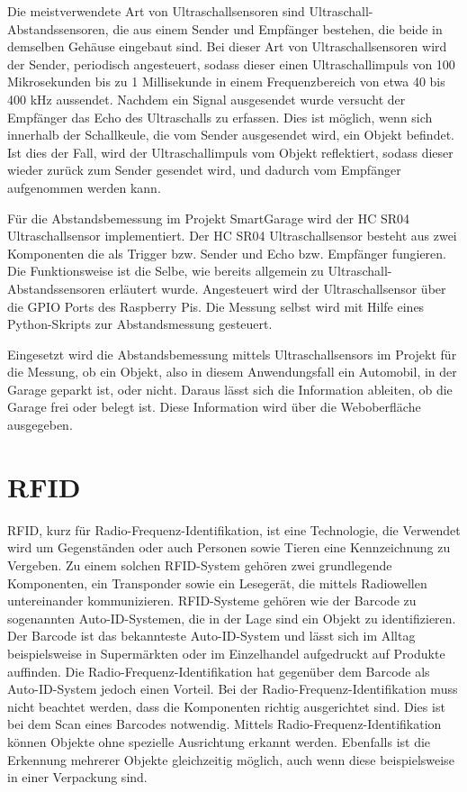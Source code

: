 Die meistverwendete Art von Ultraschallsensoren sind Ultraschall-Abstandssensoren, die aus einem Sender und Empfänger bestehen, die beide in demselben Gehäuse eingebaut sind. Bei dieser Art von Ultraschallsensoren wird der Sender, periodisch angesteuert, sodass dieser einen Ultraschallimpuls von 100 Mikrosekunden bis zu 1 Millisekunde in einem Frequenzbereich von etwa 40 bis 400 kHz aussendet. Nachdem ein Signal ausgesendet wurde versucht der Empfänger das Echo des Ultraschalls zu erfassen. Dies ist möglich, wenn sich innerhalb der Schallkeule, die vom Sender ausgesendet wird, ein Objekt befindet. Ist dies der Fall, wird der Ultraschallimpuls vom Objekt reflektiert, sodass dieser wieder zurück zum Sender gesendet wird, und dadurch vom Empfänger aufgenommen werden kann.

Für die Abstandsbemessung im Projekt SmartGarage wird der HC SR04 Ultraschallsensor implementiert. Der HC SR04 Ultraschallsensor besteht aus zwei Komponenten die als Trigger bzw. Sender und Echo bzw. Empfänger fungieren. Die Funktionsweise ist die Selbe, wie bereits allgemein zu Ultraschall-Abstandssensoren erläutert wurde. Angesteuert wird der Ultraschallsensor über die GPIO Ports des Raspberry Pis. Die Messung selbst wird mit Hilfe eines Python-Skripts zur Abstandsmessung gesteuert. 

Eingesetzt wird die Abstandsbemessung mittels Ultraschallsensors im Projekt für die Messung, ob ein Objekt, also in diesem Anwendungsfall ein Automobil, in der Garage geparkt ist, oder nicht. Daraus lässt sich die Information ableiten, ob die Garage frei oder belegt ist. Diese Information wird über die Weboberfläche ausgegeben.




\section{RFID}
RFID, kurz für Radio-Frequenz-Identifikation, ist eine Technologie, die Verwendet wird um Gegenständen oder auch Personen sowie Tieren eine Kennzeichnung zu Vergeben. Zu einem solchen RFID-System gehören zwei grundlegende Komponenten, ein Transponder sowie ein Lesegerät, die mittels Radiowellen untereinander kommunizieren. RFID-Systeme gehören wie der Barcode zu sogenannten Auto-ID-Systemen, die in der Lage sind ein Objekt zu identifizieren. Der Barcode ist das bekannteste Auto-ID-System und lässt sich im Alltag beispielsweise in Supermärkten oder im Einzelhandel aufgedruckt auf Produkte auffinden. Die Radio-Frequenz-Identifikation hat gegenüber dem Barcode als Auto-ID-System jedoch einen Vorteil. Bei der Radio-Frequenz-Identifikation muss nicht beachtet werden, dass die Komponenten richtig ausgerichtet sind. Dies ist bei dem Scan eines Barcodes notwendig. Mittels Radio-Frequenz-Identifikation können Objekte ohne spezielle Ausrichtung erkannt werden. Ebenfalls ist die Erkennung mehrerer Objekte gleichzeitig möglich, auch wenn diese beispielsweise in einer Verpackung sind.\autocite[Vgl.][S. 1]{rfid}

